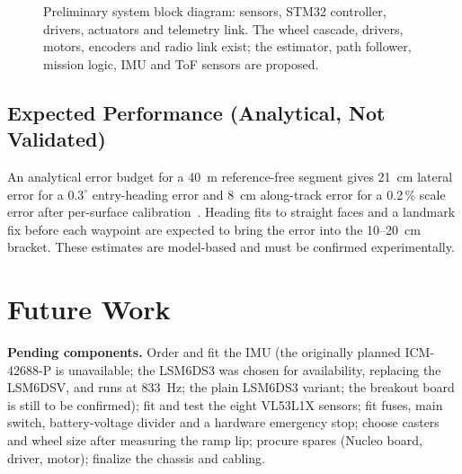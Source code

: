 \documentclass[conference]{IEEEtran}\newcommand{\haveieee}{}%
\begin{document}
\begin{figure}[!t]
{}
\caption{Preliminary system block diagram: sensors, STM32 controller, drivers, actuators and telemetry link. The wheel cascade, drivers, motors, encoders and radio link exist; the estimator, path follower, mission logic, IMU and ToF sensors are proposed.}
\label{fig:blocks}
\end{figure}

\subsection{Expected Performance (Analytical, Not Validated)}
An analytical error budget for a 40~m reference-free segment gives 21~cm lateral error for a $0.3^\circ$ entry-heading error and 8~cm along-track error for a 0.2\,\% scale error after per-surface calibration~\cite{techref}. Heading fits to straight faces and a landmark fix before each waypoint are expected to bring the error into the 10--20~cm bracket. These estimates are model-based and must be confirmed experimentally.

\section{Future Work}
\textbf{Pending components.} Order and fit the IMU (the originally planned ICM-42688-P is unavailable; the LSM6DS3 was chosen for availability, replacing the LSM6DSV, and runs at 833~Hz; the plain LSM6DS3 variant; the breakout board is still to be confirmed); fit and test the eight VL53L1X sensors; fit fuses, main switch, battery-voltage divider and a hardware emergency stop; choose casters and wheel size after measuring the ramp lip; procure spares (Nucleo board, driver, motor); finalize the chassis and cabling.
\end{document}
